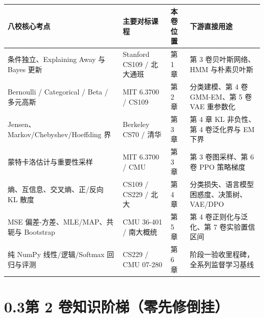 \begin{center}
\footnotesize
\begin{tabularx}{\linewidth}{@{}p{34mm}p{34mm}p{16mm}X@{}}
\toprule
\textbf{八校核心考点} & \textbf{主要对标课程} & \textbf{本卷位置} & \textbf{下游直接用途} \\
\midrule
条件独立、Explaining Away 与 Bayes 更新 & Stanford CS109 / 北大通班 & 第 1 章 & 第 3 卷贝叶斯网络、HMM 与朴素贝叶斯 \\
Bernoulli / Categorical / Beta / 多元高斯 & MIT 6.3700 / CS109 & 第 2 章 & 分类建模、第 4 卷 GMM-EM、第 5 卷 VAE 重参数化 \\
Jensen、Markov/Chebyshev/Hoeffding 界 & Berkeley CS70 / 清华 & 第 3 章 & 第 4 章 KL 非负性、第 4 卷泛化界与 EM 下界 \\
蒙特卡洛估计与重要性采样 & MIT 6.3700 / CMU & 第 3 章 & 第 3 卷图采样、第 6 卷 PPO 策略梯度 \\
熵、互信息、交叉熵、正/反向 KL 散度 & CS109 / CS229 / 北大 & 第 4 章 & 分类损失、语言模型困惑度、决策树、VAE/DPO \\
MSE 偏差-方差、MLE/MAP、共轭与 Bootstrap & CMU 36-401 / 南大概统 & 第 5 章 & 第 4 卷正则化与泛化、第 7 卷实验置信区间 \\
纯 NumPy 线性/逻辑/Softmax 回归与评测 & CS229 / CMU 07-280 & 第 6 章 & 阶段一验收里程碑，全系列监督学习基线 \\
\bottomrule
\end{tabularx}
\end{center}

\section*{0.3\quad 第 2 卷知识阶梯（零先修倒挂）}

